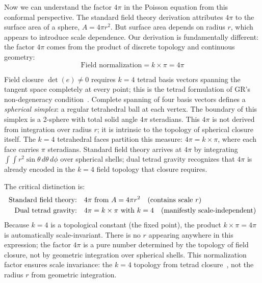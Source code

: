 \documentclass[aps,prd,preprint,superscriptaddress,showpacs,preprintnumbers,amsmath,amssymb,nofootinbib]{revtex4-2}
\begin{document}
Now we can understand the factor $4\pi$ in the Poisson equation from this conformal perspective. The standard field theory derivation attributes $4\pi$ to the surface area of a sphere, $A = 4\pi r^2$. But surface area depends on radius $r$, which appears to introduce scale dependence. Our derivation is fundamentally different: the factor $4\pi$ comes from the product of discrete topology and continuous geometry:
\begin{equation}
\text{Field normalization} = k \times \pi = 4\pi
\label{eq:field-normalization}
\end{equation}

Field closure $\det(e) \neq 0$ requires $k=4$ tetrad basis vectors spanning the tangent space completely at every point; this is the tetrad formulation of GR's non-degeneracy condition~\cite{mtw1973,wald1984}. Complete spanning of four basis vectors defines a \emph{spherical simplex}: a regular tetrahedral ball at each vertex. The boundary of this simplex is a 2-sphere with total solid angle $4\pi$ steradians. This $4\pi$ is not derived from integration over radius $r$; it is intrinsic to the topology of spherical closure itself. The $k=4$ tetrahedral faces partition this measure: $4\pi = k \times \pi$, where each face carries $\pi$ steradians. Standard field theory arrives at $4\pi$ by integrating $\int\int r^2 \sin\theta\,d\theta\,d\phi$ over spherical shells; dual tetrad gravity recognizes that $4\pi$ is already encoded in the $k=4$ field topology that closure requires.

The critical distinction is:
\begin{align}
\text{Standard field theory:} \quad & 4\pi \text{ from } A = 4\pi r^2 \quad \text{(contains scale } r\text{)} \notag \\
\text{Dual tetrad gravity:} \quad & 4\pi = k \times \pi \text{ with } k=4 \quad \text{(manifestly scale-independent)}
\label{eq:4pi-distinction}
\end{align}
Because $k=4$ is a topological constant (the fixed point), the product $k\times\pi = 4\pi$ is automatically scale-invariant. There is no $r$ appearing anywhere in this expression; the factor $4\pi$ is a pure number determined by the topology of field closure, not by geometric integration over spherical shells. This normalization factor ensures scale invariance: the $k=4$ topology from tetrad closure~\cite{mtw1973,wald1984}, not the radius $r$ from geometric integration.
\end{document}
